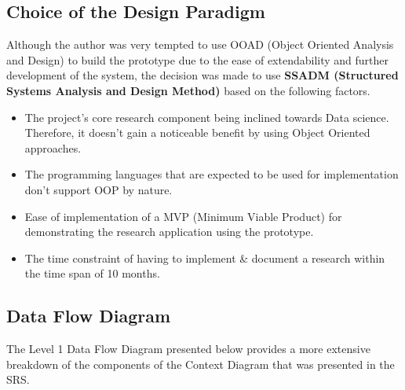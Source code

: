 \subsection{Choice of the Design Paradigm}
Although the author was very tempted to use OOAD (Object Oriented Analysis and Design) to build the prototype due to the ease of extendability and further development of the system, the decision was made to use \textbf{SSADM (Structured Systems Analysis and Design Method)} based on the following factors.
\begin{itemize}
\item The project's core research component being inclined towards Data science. Therefore, it doesn't gain a noticeable benefit by using Object Oriented approaches.
\item The programming languages that are expected to be used for implementation don't support OOP by nature.
\item Ease of implementation of a MVP (Minimum Viable Product) for demonstrating the research application using the prototype.
\item The time constraint of having to implement \& document a research within the time span of 10 months.
\end{itemize}



\subsection{Data Flow Diagram}

The Level 1 Data Flow Diagram presented below provides a more extensive breakdown of the components of the Context Diagram that was presented in the SRS.


